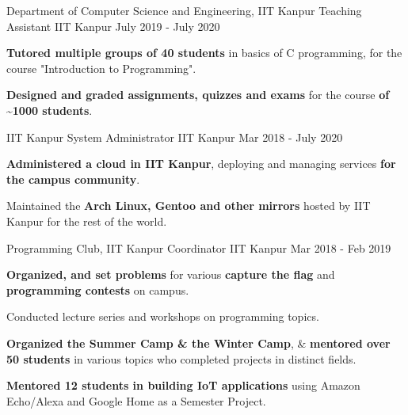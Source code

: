 

\begin{cventries}

  \extraentry
  {Department of Computer Science and Engineering, IIT Kanpur}
  {Teaching Assistant}
  {IIT Kanpur}
  {July 2019 - July 2020}
  {
    \begin{cvitems}
    \item \textbf{Tutored multiple groups of 40 students} in basics of C programming, for the course "Introduction to Programming".
    \item \textbf{Designed and graded assignments, quizzes and exams} for the course \textbf{of \textasciitilde 1000 students}.
    \end{cvitems}
  }

  \extraentry
  {IIT Kanpur}
  {System Administrator}
  {IIT Kanpur}
  {Mar 2018 - July 2020}
  {
    \begin{cvitems}
    \item \textbf{Administered a cloud in IIT Kanpur}, deploying and managing services \textbf{for the campus community}.
    \item Maintained the \textbf{Arch Linux, Gentoo and other mirrors} hosted by IIT Kanpur for the rest of the world.
    \end{cvitems}
  }

  \extraentry
  {Programming Club, IIT Kanpur}
  {Coordinator}
  {IIT Kanpur}
  {Mar 2018 - Feb 2019}
  {
    \begin{cvitems}
      \item \textbf{Organized, and set problems} for various \textbf{capture the flag} and \textbf{programming contests} on campus.
      \item Conducted lecture series and workshops on programming topics.
      \item \textbf{Organized the Summer Camp \& the Winter Camp}, \& \textbf{mentored over 50 students} in various topics who completed projects in distinct fields.
      \item \textbf{Mentored 12 students in building IoT applications} using Amazon Echo/Alexa and Google Home as a Semester Project.
    \end{cvitems}
  }


\end{cventries}
